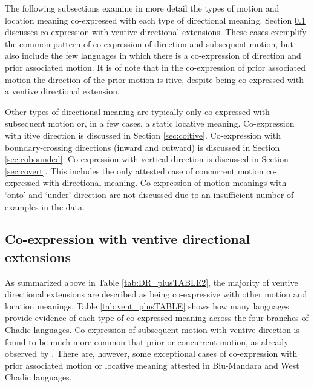 The following subsections examine in more detail the types of motion and location meaning co-expressed with each type of directional meaning. Section \ref{sec:covent} discusses co-expression with ventive directional extensions. These cases exemplify the common pattern of co-expression of direction and subsequent motion, but also include the few languages in which there is a co-expression of direction and prior associated motion. It is of note that in the co-expression of prior associated motion the direction of the prior motion is itive, despite being co-expressed with a ventive directional extension.

Other types of directional meaning are typically only co-expressed with subsequent motion or, in a few cases, a static locative meaning. Co-expression with itive direction is discussed in Section \ref{sec:coitive}. Co-expression with boundary-crossing directions (inward and outward) is discussed in Section \ref{sec:cobounded}. Co-expression with vertical direction is discussed in Section \ref{sec:covert}. This includes the only attested case of concurrent motion co-expressed with directional meaning. Co-expression of motion meanings with `onto' and `under' direction are not discussed due to an insufficient number of examples in the data.

\subsection{Co-expression with ventive directional extensions} \label{sec:covent}

As summarized above in Table \ref{tab:DR_plusTABLE2}, the majority of ventive directional extensions are described as being co-expressive with other motion and location meanings. Table \ref{tab:vent_plusTABLE} shows how many languages provide evidence of each type of co-expressed meaning across the four branches of Chadic languages. Co-expression of subsequent motion with ventive direction is found to be much more common that prior or concurrent motion, as already observed by  \citet[253]{bourdinAllerVenirSomali2005}. There are, however, some exceptional cases of co-expression with prior associated motion or locative meaning attested in Biu-Mandara and West Chadic languages.

